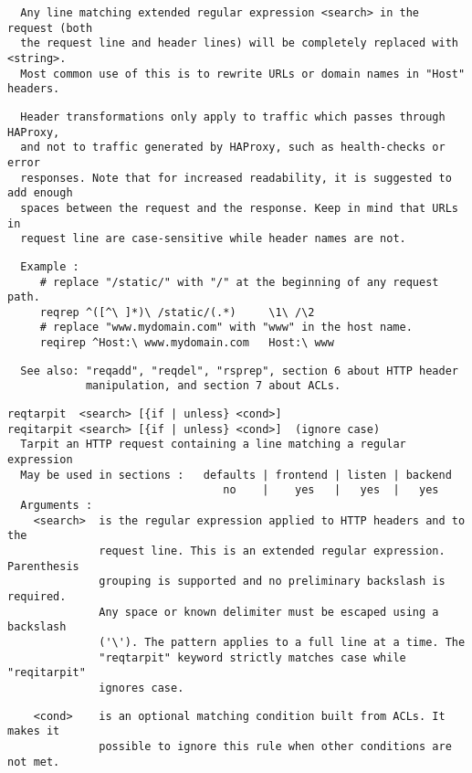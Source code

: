 \begin{verbatim}
  Any line matching extended regular expression <search> in the request (both
  the request line and header lines) will be completely replaced with <string>.
  Most common use of this is to rewrite URLs or domain names in "Host" headers.
\end{verbatim}

\begin{verbatim}
  Header transformations only apply to traffic which passes through HAProxy,
  and not to traffic generated by HAProxy, such as health-checks or error
  responses. Note that for increased readability, it is suggested to add enough
  spaces between the request and the response. Keep in mind that URLs in
  request line are case-sensitive while header names are not.
\end{verbatim}

\begin{verbatim}
  Example :
     # replace "/static/" with "/" at the beginning of any request path.
     reqrep ^([^\ ]*)\ /static/(.*)     \1\ /\2
     # replace "www.mydomain.com" with "www" in the host name.
     reqirep ^Host:\ www.mydomain.com   Host:\ www
\end{verbatim}

\begin{verbatim}
  See also: "reqadd", "reqdel", "rsprep", section 6 about HTTP header
            manipulation, and section 7 about ACLs.
\end{verbatim}

\begin{verbatim}
reqtarpit  <search> [{if | unless} <cond>]
reqitarpit <search> [{if | unless} <cond>]  (ignore case)
  Tarpit an HTTP request containing a line matching a regular expression
  May be used in sections :   defaults | frontend | listen | backend
                                 no    |    yes   |   yes  |   yes
  Arguments :
    <search>  is the regular expression applied to HTTP headers and to the
              request line. This is an extended regular expression. Parenthesis
              grouping is supported and no preliminary backslash is required.
              Any space or known delimiter must be escaped using a backslash
              ('\'). The pattern applies to a full line at a time. The
              "reqtarpit" keyword strictly matches case while "reqitarpit"
              ignores case.
\end{verbatim}

\begin{verbatim}
    <cond>    is an optional matching condition built from ACLs. It makes it
              possible to ignore this rule when other conditions are not met.
\end{verbatim}

